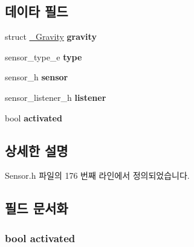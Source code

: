 \subsection*{데이타 필드}
\begin{DoxyCompactItemize}
\item 
\hypertarget{struct__GravityExtend_ae4623ab137188f79a517066e08032746}{struct \hyperlink{struct__Gravity}{\-\_\-\-Gravity} {\bfseries gravity}}\label{struct__GravityExtend_ae4623ab137188f79a517066e08032746}

\item 
\hypertarget{struct__GravityExtend_abffb09766da2fc510a79bb51f82a36e1}{sensor\-\_\-type\-\_\-e {\bfseries type}}\label{struct__GravityExtend_abffb09766da2fc510a79bb51f82a36e1}

\item 
\hypertarget{struct__GravityExtend_a5bae9b7801bc3808411925cde81d3f26}{sensor\-\_\-h {\bfseries sensor}}\label{struct__GravityExtend_a5bae9b7801bc3808411925cde81d3f26}

\item 
\hypertarget{struct__GravityExtend_aa977dfb866b24fd7d9a20a9a01b2fd1f}{sensor\-\_\-listener\-\_\-h {\bfseries listener}}\label{struct__GravityExtend_aa977dfb866b24fd7d9a20a9a01b2fd1f}

\item 
\hypertarget{struct__GravityExtend_a73e9fa0c3543560192f38a8ab6a78c47}{bool {\bfseries activated}}\label{struct__GravityExtend_a73e9fa0c3543560192f38a8ab6a78c47}

\end{DoxyCompactItemize}


\subsection{상세한 설명}


Sensor.\-h 파일의 176 번째 라인에서 정의되었습니다.



\subsection{필드 문서화}
\hypertarget{struct__GravityExtend_a73e9fa0c3543560192f38a8ab6a78c47}{
\subsubsection[{activated}]{\setlength{\rightskip}{0pt plus 5cm}bool activated}}\label{struct__GravityExtend_a73e9fa0c3543560192f38a8ab6a78c47}


